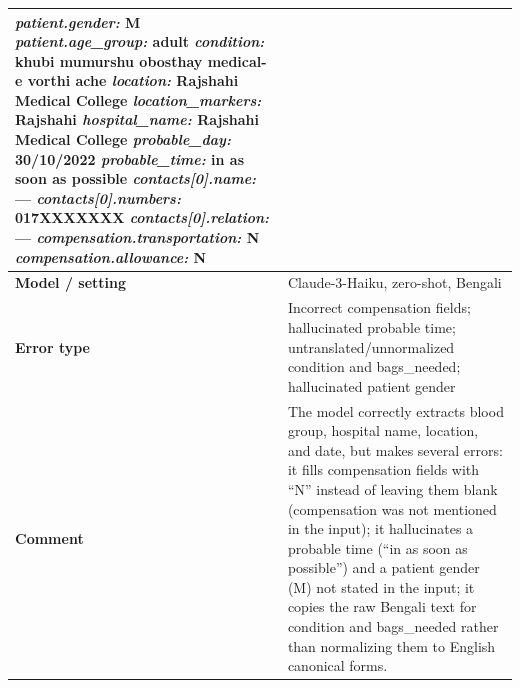 \documentclass[11pt]{article}
\begin{document}
\begin{table}[t]
\begin{tabularx}{\textwidth}{@{}p{}XX@{}}
{\textit{patient.gender:} M\newline
\textit{patient.age\_group:} adult\newline
\textit{condition:} khubi mumurshu obosthay medical-e vorthi ache\newline
\textit{location:} Rajshahi Medical College\newline
\textit{location\_markers:} Rajshahi\newline
\textit{hospital\_name:} Rajshahi Medical College\newline
\textit{probable\_day:} 30/10/2022\newline
\textit{probable\_time:} in as soon as possible\newline
\textit{contacts[0].name:} ---\newline
\textit{contacts[0].numbers:} 017XXXXXXX\newline
\textit{contacts[0].relation:} ---\newline
\textit{compensation.transportation:} N\newline
\textit{compensation.allowance:} N
} \\
\midrule
\textbf{Model / setting} & \multicolumn{2}{p{0.75\textwidth}}{Claude-3-Haiku, zero-shot, Bengali} \\
\textbf{Error type} & \multicolumn{2}{p{0.75\textwidth}}{Incorrect compensation fields; hallucinated probable time; untranslated/unnormalized condition and bags\_needed; hallucinated patient gender} \\
\textbf{Comment} & \multicolumn{2}{p{0.75\textwidth}}{The model correctly extracts blood group, hospital name, location, and date, but makes several errors: it fills compensation fields with ``N'' instead of leaving them blank (compensation was not mentioned in the input); it hallucinates a probable time (``in as soon as possible'') and a patient gender (M) not stated in the input; it copies the raw Bengali text for condition and bags\_needed rather than normalizing them to English canonical forms.} \\
\bottomrule
\end{tabularx}
\end{table}
\end{document}
